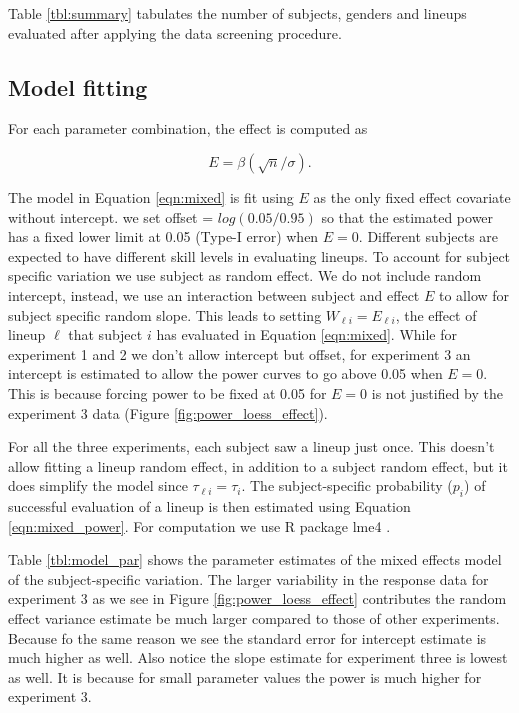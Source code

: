 \documentclass{article}
\newcommand{\green}[1]{{\color{green} #1}} %
\begin{document}
Table \ref{tbl:summary} tabulates the number of subjects, genders and lineups evaluated after applying the data screening procedure. 

\subsection{Model fitting}
For each parameter combination, the effect is computed as 

\[
E=\beta (\sqrt {n}/\sigma).
\]

The model in Equation \ref{eqn:mixed} is fit using $E$ as the only fixed effect covariate without intercept. we set offset = $log(0.05/0.95)$ so that the estimated power has a fixed lower limit at 0.05 (Type-I error) when $E=0$. Different subjects are expected to have different skill levels in evaluating lineups. To account for subject specific variation we use subject as random effect. We do not include random intercept, instead, we use an interaction between subject and effect $E$ to allow for subject specific random slope. This leads to setting  $W_{\ell i} = E_{\ell i}$, the effect of lineup $\ell$ that subject $i$ has evaluated in Equation \ref{eqn:mixed}.  While for experiment 1 and 2 we don't allow intercept but offset, for experiment 3 an intercept is estimated to allow the power curves to go above 0.05 when $E=0$. This is because forcing power to be fixed at 0.05 for $E=0$ is not justified by the experiment 3 data (Figure \ref{fig:power_loess_effect}). 

For all the three experiments, each subject saw a lineup just once. This doesn't allow fitting a lineup random effect, in addition to a subject random effect, but it does simplify the model since $\tau_{\ell i} = \tau_i$. The subject-specific probability ($p_i$) of successful evaluation of a lineup is then estimated using Equation \ref{eqn:mixed_power}. For computation we use R \citep{R} package lme4 \citep{lme4:2011}.

Table \ref{tbl:model_par} shows the parameter estimates of the mixed effects model of the subject-specific variation. The larger variability in the response data for experiment 3 as we see in Figure \ref{fig:power_loess_effect} contributes the random effect variance estimate be much larger compared to those of other experiments. Because fo the same reason we see the standard error for intercept estimate is much higher as well. Also notice the slope estimate for experiment three is lowest as well. It is because for small parameter values the power is much higher for experiment 3.  %
\end{document}
